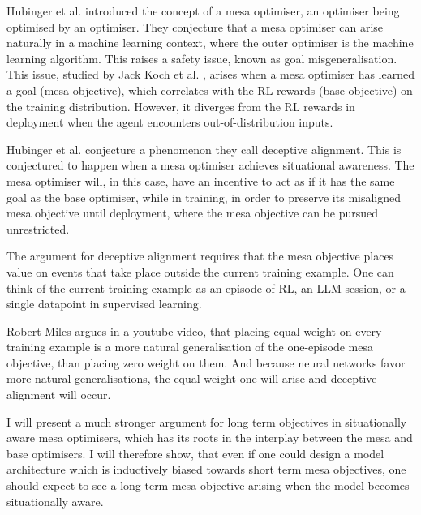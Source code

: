 Hubinger et al.\cite{hubinger2021} introduced the concept of a mesa optimiser, an optimiser being optimised by
an optimiser.
They conjecture that a mesa optimiser can arise naturally in a machine learning context, where the outer optimiser is
the machine learning algorithm.
This raises a safety issue, known as goal misgeneralisation.
This issue, studied by Jack Koch et al. \cite{jackkoch2023}, arises when a mesa optimiser has learned a goal
(mesa objective), which correlates with the RL rewards (base objective) on the training distribution.
However, it diverges from the RL rewards in deployment when the agent encounters out-of-distribution inputs.

Hubinger et al.\cite{hubinger2021} conjecture a phenomenon they call deceptive alignment.
This is conjectured to happen when a mesa optimiser achieves situational awareness.
The mesa optimiser will, in this case, have an incentive to act as if it has the same goal as the base optimiser,
while in training, in order to preserve its misaligned mesa objective until deployment, where the mesa objective can be
pursued unrestricted.

The argument for deceptive alignment requires that the mesa objective places value on events that take place outside
the current training example.
One can think of the current training example as an episode of RL, an LLM session, or a single datapoint in supervised
learning.

Robert Miles argues in a youtube video\cite{robertmiles}, that placing equal weight on every training example is a more
natural generalisation of the one-episode mesa objective, than placing zero weight on them.
And because neural networks favor more natural generalisations, the equal weight one will arise and deceptive alignment
will occur.

I will present a much stronger argument for long term objectives in situationally aware mesa optimisers, which has its
roots in the interplay between the mesa and base optimisers.
I will therefore show, that even if one could design a model architecture which is inductively biased towards short term
mesa objectives, one should expect to see a long term mesa objective arising when the model becomes situationally aware.